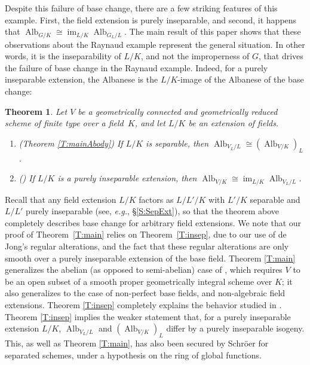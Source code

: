 \documentclass[11pt, reqno]{amsart}
\numberwithin{equation}{section}
\newtheorem*{teo*}{Theorem}
\theoremstyle{definition}
\theoremstyle{remark}
\DeclareMathOperator{\im}{im}
\def\iso{\cong}
\DeclareMathOperator{\alb}{Alb}
\begin{document}
Despite this failure of base change, 
there are a few striking features of this example.  First, the field extension is purely inseparable, and second, it happens that   $\alb_{G/K} \iso \im_{L/K} \alb_{G_L/L}$.
  The main result of this paper shows that these observations about the Raynaud example represent the general situation.  In other words,   it is the
inseparability of $L/K$, and not the improperness of $G$, that drives
the failure of base change in the Raynaud example.  Indeed,  for a purely inseparable extension, the Albanese is the $L/K$-image of the Albanese of the base change:


\begin{teo*}\label{T:T}
   Let $V$ be a 
    geometrically connected and geometrically reduced 
  scheme of finite type over a field~$K$, 
  and let $L/K$ be an extension of fields.
  \begin{enumerate}[label={\bf(\Alph*)}]
  \item\label{T:main}  (Theorem \ref{T:mainAbody}) If $L/K$ is separable, then $\alb_{V_L/L} \iso (\alb_{V/K})_L$.
  \item\label{T:insep} () If $L/K$ is a purely inseparable extension, then $\alb_{V/K} \iso \im_{L/K} \alb_{V_L/L}$.
  \end{enumerate}
\end{teo*}

Recall that any field extension $L/K$ factors as $L/L'/K$ with $L'/K$ separable and $L/L'$ purely inseparable (see, \emph{e.g.},  \S\ref{S:SepExt}), so that the theorem above completely describes base change for arbitrary field extensions.
We note that our proof of Theorem~\ref{T:main} relies on Theorem~\ref{T:insep}, due to our use of de Jong's regular alterations, and the fact that these regular alterations are only smooth over a purely inseparable extension of the base field.
Theorem \ref{T:main} generalizes the abelian (as opposed to semi-abelian) case
        of \cite[Cor.~A.5]{wittenberg08}, which requires $V$ to be an open
 subset of a smooth proper geometrically integral  scheme over
 $K$; it also generalizes \cite[Prop.~A.3(i)]{mochizuki12} to the case
 of non-perfect base fields, and non-algebraic field extensions.
 Theorem \ref{T:insep} completely explains the behavior studied in
 \cite[Ex.~4.2.7]{brionstructure}.   Theorem \ref{T:insep} implies
 the weaker statement that, for a purely inseparable extension $L/K$, $\alb_{V_L/L}$ and
 $(\alb_{V/K})_L$ differ by a purely inseparable isogeny.  This, as
 well as Theorem \ref{T:main}, has also been secured by Schr\"oer
\cite[Thm.~6.1]{schroeralbanese} for separated schemes, under a
hypothesis on the ring of global functions.
\end{document}
